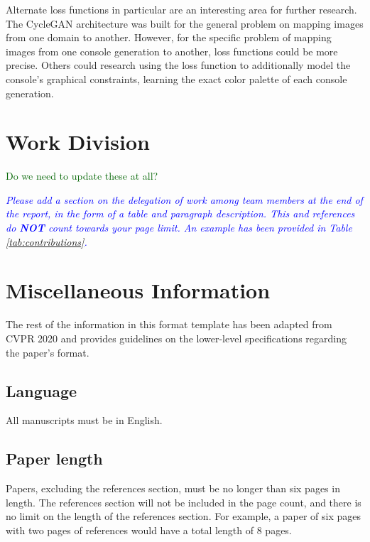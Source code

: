 \documentclass[10pt,twocolumn,letterpaper]{article}
\begin{document}
Alternate loss functions in particular are an interesting area for further research. The CycleGAN architecture was built for the general problem on mapping images from one domain to another. However, for the specific problem of mapping images from one console generation to another, loss functions could be more precise. Others could research using the loss function to additionally model the console's graphical constraints, learning the exact color palette of each console generation.


\section{Work Division}
\textcolor{darkgreen}{Do we need to update these at all?}

\textit{\textcolor{blue}{Please add a section on the delegation of work among team members at the end of the report, in the form of a table and paragraph description. This and references do \textbf{NOT} count towards your page limit. An example has been provided in Table \ref{tab:contributions}.}}

\newpage
\newpage
\section{Miscellaneous Information}

The rest of the information in this format template has been adapted from CVPR 2020 and provides guidelines on the lower-level specifications regarding the paper's format.

\subsection{Language}

All manuscripts must be in English.


\subsection{Paper length}
Papers, excluding the references section,
must be no longer than six pages in length. The references section
will not be included in the page count, and there is no limit on the
length of the references section. For example, a paper of six pages
with two pages of references would have a total length of 8 pages.

\end{document}
